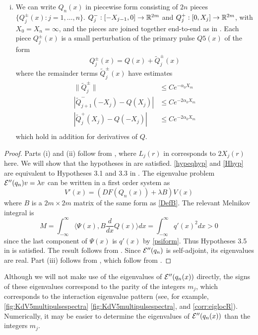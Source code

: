\documentclass[thesis.tex]{subfiles}
\begin{document}
\begin{theorem}
\begin{enumerate}[(i)]
\item We can write $Q_n(x)$ in piecewise form consisting of $2n$ pieces $\{ Q_j^\pm(x) : j = 1, \dots, n \}$. $Q_j^-: [-X_{j-1}, 0] \rightarrow \mathbb{R}^{2m}$ and $Q_j^+: [0, X_j] \rightarrow \mathbb{R}^{2m}$, with $X_0 = X_n = \infty$, and the pieces are joined together end-to-end as in \cite{Sandstede1998}. Each piece $Q_j^\pm(x)$ is a small perturbation of the primary pulse $Q5(x)$ of the form
\begin{equation}\label{Qpmexpansions}
Q_j^\pm(x) = Q(x) + \tilde{Q}_j^\pm(x)
\end{equation}
where the remainder terms $\tilde{Q}_j^\pm(x)$ have estimates
\begin{equation}\label{Qpmestimates}
\begin{aligned}
\|\tilde{Q}_j^\pm\| &\leq C e^{-\alpha_0 X_m} \\
|\tilde{Q}_{j+1}^-(-X_j) - Q(X_j)| &\leq C e^{-2 \alpha_0 X_m} \\
|\tilde{Q}_j^+(X_j) - Q(-X_j)| &\leq C e^{-2 \alpha_0 X_m} \\
\end{aligned}
\end{equation}
which hold in addition for derivatives of $Q$.
\end{enumerate}
\begin{proof}
Parts (i) and (ii) follow from \cite{SandstedeStrut}, where $L_j(r)$ in \cite{SandstedeStrut} corresponds to $2X_j(r)$ here. We will show that the hypotheses in \cite{SandstedeStrut} are satisfied. \cref{hypeqhyp} and \cref{Hhyp} are equivalent to Hypotheses 3.1 and 3.3 in \cite{SandstedeStrut}. The eigenvalue problem $\mathcal{E}''(q_n)v = \lambda v$ can be written in a first order system as
\[
V'(x) = (DF(Q_n(x)) + \lambda B )V(x)
\]
where $B$ is a $2m\times 2m$ matrix of the same form as \cref{DefB}. The relevant Melnikov integral is
\[
M = \int_{-\infty}^\infty \langle \Psi(x), B \frac{d}{dx} Q(x) \rangle  dx = \int_{-\infty}^\infty q'(x)^2 dx > 0
\]
since the last component of $\Psi(x)$ is $q'(x)$ by \cref{psiform}. Thus Hypotheses 3.5 in \cite{SandstedeStrut} is satisfied. The result follows from \cite[Theorem 3.6]{SandstedeStrut}. Since $\mathcal{E}''(q_n)$ is self-adjoint, its eigenvalues are real. Part (iii) follows from \cite[Theorem 2]{Sandstede1998}, which follow from \cite{Sandstede1993}.
\end{proof}
\end{theorem}

\begin{remark}
Although we will not make use of the eigenvalues of $\mathcal{E}''(q_n(x))$ directly, the signs of these eigenvalues correspond to the parity of the integers $m_j$, which corresponds to the interaction eigenvalue pattern (see, for example, \cref{fig:KdV5multipulsespectra} \cref{fig:KdV5multipulsespectra}, and \cref{corr:eiglocR}). Numerically, it may be easier to determine the eigenvalues of $\mathcal{E}''(q_n(x))$ than the integers $m_j$. 
\end{remark}
\end{document}
